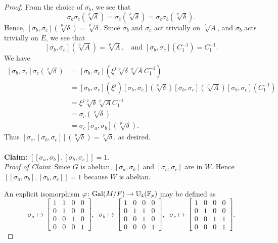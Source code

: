 \documentclass[12pt,leqno]{amsart}
\theoremstyle{plain}
\theoremstyle{definition}
\newcommand{\F}{{\mathbb F}}
\newcommand{\U}{{\mathbb U}}
\begin{document}
\begin{proof}
From the choice of $\sigma_b$, we see that
\[
\sigma_b\sigma_c(\sqrt[p]{\delta})=\sigma_c(\sqrt[p]{\delta})= \sigma_c\sigma_b(\sqrt[p]{\delta}).
\]
Hence,  $[\sigma_b,\sigma_c](\sqrt[p]{\delta})=\sqrt[p]{\delta}$. 
Since $\sigma_b$ and $\sigma_c$ act trivially on $\sqrt[p]{A}$, and $\sigma_b$ acts trivially on $E$, we see that
\[
[\sigma_b,\sigma_c](\sqrt[p]{A})=\sqrt[p]{A},\;\; \text{ and } [\sigma_b,\sigma_c](C_1^{-1})=C_1^{-1}.
\]
We have 
\[
\begin{aligned}
{[\sigma_b,\sigma_c]}\sigma_c (\sqrt[p]{\delta})&=[\sigma_b,\sigma_c](\xi^j\sqrt[p]{\delta}\sqrt[p]{A}C_1^{-1})\\
&= [\sigma_b,\sigma_c](\xi^j) [\sigma_b,\sigma_c](\sqrt[p]{\delta}) [\sigma_b,\sigma_c](\sqrt[p]{A}) [\sigma_b,\sigma_c](C_1^{-1})\\
&= \xi^j \sqrt[p]{\delta}\sqrt[p]{A}C_1^{-1}\\
&=\sigma_c(\sqrt[p]{\delta})\\
&=\sigma_c[\sigma_a,\sigma_b](\sqrt[p]{\delta}).
\end{aligned}
\]
Thus $[\sigma_c,[\sigma_b,\sigma_c]](\sqrt[p]{\delta})=\sqrt[p]{\delta}$, as desired. 
\\
\\
{\bf Claim:} $[[\sigma_a,\sigma_b],[\sigma_b,\sigma_c]]=1$.\\
{\it Proof of Claim}: Since $G$ is abelian,  $[\sigma_a,\sigma_b]$ and $[\sigma_b,\sigma_c]$ are in $W$. Hence $[[\sigma_a,\sigma_b],[\sigma_b,\sigma_c]]=1$ because $W$ is abelian. 


  An explicit isomorphism $\varphi\colon {\rm Gal}(M/F)\to \U_4(\F_p)$ may be defined as
\[
\sigma_a \mapsto \begin{bmatrix}
1& 1 & 0 & 0\\
0& 1 & 0 & 0\\
0& 0 & 1 & 0\\
0& 0 & 0 & 1
\end{bmatrix}, \; \;
\sigma_b\mapsto  \begin{bmatrix}
1& 0 & 0 & 0\\
0& 1 & 1 & 0\\
0& 0 & 1 & 0\\
0& 0 & 0 & 1
\end{bmatrix}, \;\;
 \sigma_c\mapsto \begin{bmatrix}
1& 0 & 0 & 0\\
0& 1 & 0 & 0\\
0& 0 & 1 & 1\\
0& 0 & 0 & 1
\end{bmatrix}.
\]
\end{proof}
\end{document}
